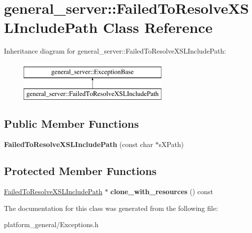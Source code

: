 \hypertarget{classgeneral__server_1_1FailedToResolveXSLIncludePath}{\section{general\-\_\-server\-:\-:\-Failed\-To\-Resolve\-X\-S\-L\-Include\-Path \-Class \-Reference}
\label{classgeneral__server_1_1FailedToResolveXSLIncludePath}
}
\-Inheritance diagram for general\-\_\-server\-:\-:\-Failed\-To\-Resolve\-X\-S\-L\-Include\-Path\-:\begin{figure}[H]
\begin{center}
\leavevmode
\includegraphics[height=2.000000cm]{classgeneral__server_1_1FailedToResolveXSLIncludePath}
\end{center}
\end{figure}
\subsection*{\-Public \-Member \-Functions}
\begin{DoxyCompactItemize}
\item 
\hypertarget{classgeneral__server_1_1FailedToResolveXSLIncludePath_a1a75b302e8d7820d98596b698e042230}{{\bfseries \-Failed\-To\-Resolve\-X\-S\-L\-Include\-Path} (const char $\ast$s\-X\-Path)}\label{classgeneral__server_1_1FailedToResolveXSLIncludePath_a1a75b302e8d7820d98596b698e042230}

\end{DoxyCompactItemize}
\subsection*{\-Protected \-Member \-Functions}
\begin{DoxyCompactItemize}
\item 
\hypertarget{classgeneral__server_1_1FailedToResolveXSLIncludePath_a163cf1dbec07cdeaa6199af7899da83c}{\hyperlink{classgeneral__server_1_1FailedToResolveXSLIncludePath}{\-Failed\-To\-Resolve\-X\-S\-L\-Include\-Path} $\ast$ {\bfseries clone\-\_\-with\-\_\-resources} () const }\label{classgeneral__server_1_1FailedToResolveXSLIncludePath_a163cf1dbec07cdeaa6199af7899da83c}

\end{DoxyCompactItemize}


\-The documentation for this class was generated from the following file\-:\begin{DoxyCompactItemize}
\item 
platform\-\_\-general/\-Exceptions.\-h\end{DoxyCompactItemize}
